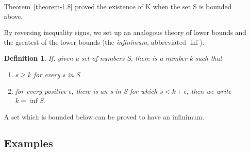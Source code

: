 \message{ !name(RealAnalysis.tex)}\documentclass[12pt]{scrbook}
\newtheorem*{definition}{Definition}
\begin{document}
Theorem~\ref{theorem-1.8} proved the existence of K when the set S is bounded above. 

By reversing inequality signs, we set up an analogous theory of lower bounds and the greatest of the lower bounds (the {\em infinimum}, abbreviated $\inf$). 

\begin{definition}
\label{def-infinimum}
If, given a set of numbers S, there is a number k such that 
\begin{enumerate}
	\item $s \ge k$ for every s in S
	\item for every positive $\epsilon$, there is an s in S for which $s < k + \epsilon$, then we write $k = \inf S$.
\end{enumerate}
\end{definition}

A set which is bounded below can be proved to have an infinimum.

\subsection{Examples}
\end{document}
